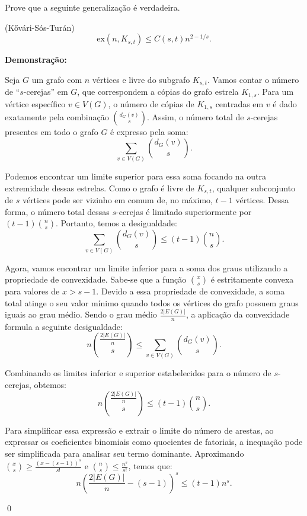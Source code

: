\documentclass[12pt]{article}
\newenvironment{problem}[2][Exercício]{\begin{trivlist}
\item[\hskip \labelsep {\bfseries #1}\hskip \labelsep {\bfseries #2.}]}{\end{trivlist}}
\newenvironment{sol}
    {\textbf{Demonstração:}\emph{}
    }
    {
    \qed
    }
\begin{document}
\begin{problem}{3}
    Prove que a seguinte generalização é verdadeira.
    
    (Kővári-Sós-Turán)
    \[
        \mathrm{ex}(n, K_{s,t}) \le C(s,t) n^{2 - 1/s}.
    \]
\end{problem}
\begin{sol}
    Seja $G$ um grafo com $n$ vértices e livre do subgrafo $K_{s,t}$.
    Vamos contar o número de ``$s$-cerejas'' em $G$, que correspondem a cópias do grafo estrela $K_{1,s}$.
    Para um vértice específico $v \in V(G)$, o número de cópias de $K_{1,s}$ centradas em $v$ é dado exatamente pela combinação $\binom{d_G(v)}{s}$.
    Assim, o número total de $s$-cerejas presentes em todo o grafo $G$ é expresso pela soma:   
    \[ 
        \sum_{v \in V(G)} \binom{d_G(v)}{s}. 
    \]

    Podemos encontrar um limite superior para essa soma focando na outra extremidade dessas estrelas.
    Como o grafo é livre de $K_{s,t}$, qualquer subconjunto de $s$ vértices pode ser vizinho em comum de, no máximo, $t-1$ vértices.
    Dessa forma, o número total dessas $s$-cerejas é limitado superiormente por $(t-1)\binom{n}{s}$.
    Portanto, temos a desigualdade:   
    \[ 
        \sum_{v \in V(G)} \binom{d_G(v)}{s} \le (t-1)\binom{n}{s}. 
    \]

    Agora, vamos encontrar um limite inferior para a soma dos graus utilizando a propriedade de convexidade.
    Sabe-se que a função $\binom{x}{s}$ é estritamente convexa para valores de $x > s - 1$.
    Devido a essa propriedade de convexidade, a soma total atinge o seu valor mínimo quando todos os vértices do grafo possuem graus iguais ao grau médio.
    Sendo o grau médio $\frac{2|E(G)|}{n}$, a aplicação da convexidade formula a seguinte desigualdade:   
    \[ 
        n \binom{\frac{2|E(G)|}{n}}{s} \le \sum_{v \in V(G)} \binom{d_G(v)}{s}. 
    \]

    Combinando os limites inferior e superior estabelecidos para o número de $s$-cerejas, obtemos:
    \[ 
        n \binom{\frac{2|E(G)|}{n}}{s} \le (t-1)\binom{n}{s}. 
    \]

    Para simplificar essa expressão e extrair o limite do número de arestas, ao expressar os coeficientes binomiais como quocientes de fatoriais, a inequação pode ser simplificada para analisar seu termo dominante.
    Aproximando $\binom{x}{s} \ge \frac{(x - (s-1))^s}{s!}$ e $\binom{n}{s} \le \frac{n^s}{s!}$, temos que:   
    \[ 
        n \left(\frac{2|E(G)|}{n} - (s-1)\right)^s \le (t-1)n^s. 
    \]


\end{sol}
\end{document}

